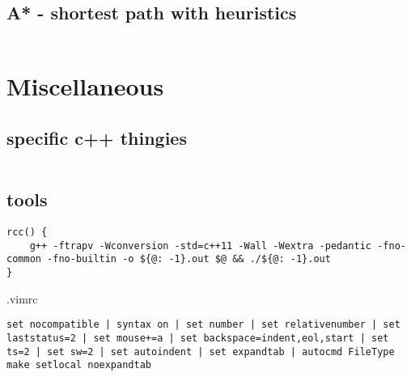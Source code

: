 \documentclass[portrait, 8pt, a4paper, oneside, landscape]{extarticle}
\begin{document}
\begin{multicols}{3}
\subsection{A* - shortest path with heuristics}
\inputminted{rust}{src/a_star.rs}


\section{Miscellaneous}
\subsection{specific c++ thingies}
\inputminted{cpp}{src/cpp_utils.cpp}

\subsection{tools}

\begin{verbatim}
rcc() {
    g++ -ftrapv -Wconversion -std=c++11 -Wall -Wextra -pedantic -fno-common -fno-builtin -o ${@: -1}.out $@ && ./${@: -1}.out
}
\end{verbatim}

.vimrc
\begin{verbatim}
set nocompatible | syntax on | set number | set relativenumber | set laststatus=2 | set mouse+=a | set backspace=indent,eol,start | set ts=2 | set sw=2 | set autoindent | set expandtab | autocmd FileType make setlocal noexpandtab
\end{verbatim}

\inputminted{bash}{src/bash_util_cmds.sh}
\end{multicols}
\end{document}
